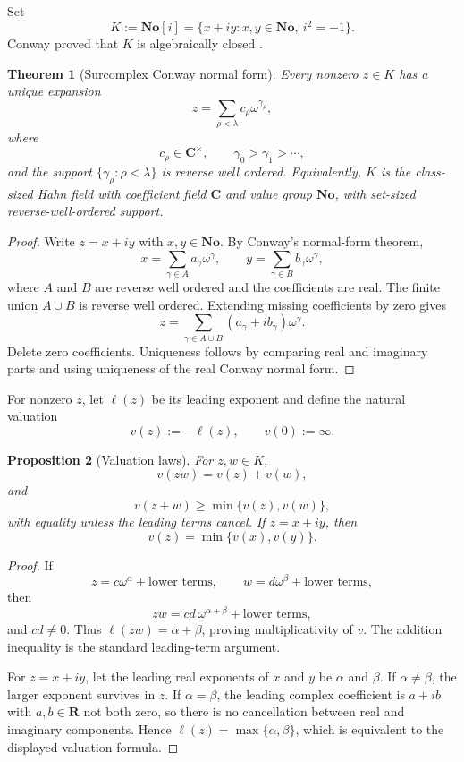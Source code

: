 \documentclass[11pt]{amsart}
\numberwithin{equation}{section}
\newtheorem{theorem}{Theorem}[section]
\newtheorem{proposition}[theorem]{Proposition}
\theoremstyle{definition}
\newcommand{\R}{\mathbf R}
\newcommand{\C}{\mathbf C}
\newcommand{\No}{\mathbf{No}}
\begin{document}
Set
\[
K:=\No[i]
=
\{x+iy:x,y\in\No,\ i^2=-1\}.
\]
Conway proved that $K$ is algebraically closed \cite{Conway}.

\begin{theorem}[Surcomplex Conway normal form]\label{thm:surcomplex-normal-form}
Every nonzero $z\in K$ has a unique expansion
\[
z=
\sum_{\rho<\lambda}
 c_\rho\omega^{\gamma_\rho},
\]
where
\[
c_\rho\in\C^\times,
\qquad
\gamma_0>\gamma_1>\cdots,
\]
and the support $\{\gamma_\rho:\rho<\lambda\}$ is reverse well ordered.  Equivalently, $K$ is the class-sized Hahn field with coefficient field $\C$ and value group $\No$, with set-sized reverse-well-ordered support.
\end{theorem}

\begin{proof}
Write $z=x+iy$ with $x,y\in\No$.  By Conway's normal-form theorem,
\[
x=\sum_{\gamma\in A}a_\gamma\omega^\gamma,
\qquad
 y=\sum_{\gamma\in B}b_\gamma\omega^\gamma,
\]
where $A$ and $B$ are reverse well ordered and the coefficients are real.  The finite union $A\cup B$ is reverse well ordered.  Extending missing coefficients by zero gives
\[
z=
\sum_{\gamma\in A\cup B}
(a_\gamma+ib_\gamma)\omega^\gamma.
\]
Delete zero coefficients.  Uniqueness follows by comparing real and imaginary parts and using uniqueness of the real Conway normal form.
\end{proof}

For nonzero $z$, let $\ell(z)$ be its leading exponent and define the natural valuation
\[
v(z):=-\ell(z),
\qquad
v(0):=\infty.
\]

\begin{proposition}[Valuation laws]\label{prop:surcomplex-valuation}
For $z,w\in K$,
\[
v(zw)=v(z)+v(w),
\]
and
\[
v(z+w)\ge\min\{v(z),v(w)\},
\]
with equality unless the leading terms cancel.  If $z=x+iy$, then
\[
v(z)=\min\{v(x),v(y)\}.
\]
\end{proposition}

\begin{proof}
If
\[
z=c\omega^\alpha+\text{lower terms},
\qquad
w=d\omega^\beta+\text{lower terms},
\]
then
\[
zw=cd\,\omega^{\alpha+\beta}+\text{lower terms},
\]
and $cd\neq0$.  Thus $\ell(zw)=\alpha+\beta$, proving multiplicativity of $v$.  The addition inequality is the standard leading-term argument.

For $z=x+iy$, let the leading real exponents of $x$ and $y$ be $\alpha$ and $\beta$.  If $\alpha\neq\beta$, the larger exponent survives in $z$.  If $\alpha=\beta$, the leading complex coefficient is $a+ib$ with $a,b\in\R$ not both zero, so there is no cancellation between real and imaginary components.  Hence $\ell(z)=\max\{\alpha,\beta\}$, which is equivalent to the displayed valuation formula.
\end{proof}
\end{document}
